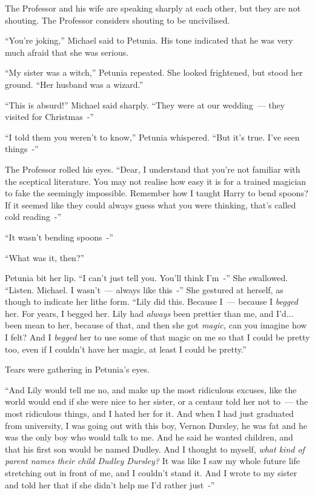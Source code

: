 The Professor and his wife are speaking sharply at each other, but they are not shouting. The Professor considers shouting to be uncivilised.

``You're joking,'' Michael said to Petunia. His tone indicated that he was very much afraid that she was serious.

``My sister was a witch,'' Petunia repeated. She looked frightened, but stood her ground. ``Her husband was a wizard.''

``This is absurd!'' Michael said sharply. ``They were at our wedding~--- they visited for Christmas~-''

``I told them you weren't to know,'' Petunia whispered. ``But it's true. I've seen things~-''

The Professor rolled his eyes. ``Dear, I understand that you're not familiar with the sceptical literature. You may not realise how easy it is for a trained magician to fake the seemingly impossible. Remember how I taught Harry to bend spoons? If it seemed like they could always guess what you were thinking, that's called cold reading~-''

``It wasn't bending spoons~-''

``What was it, then?''

Petunia bit her lip. ``I can't just tell you. You'll think I'm~-'' She swallowed. ``Listen. Michael. I wasn't~--- always like this~-'' She gestured at herself, as though to indicate her lithe form. ``Lily did this. Because I~--- because I \emph{begged} her. For years, I begged her. Lily had \emph{always} been prettier than me, and I'd... been mean to her, because of that, and then she got \emph{magic,} can you imagine how I felt? And I \emph{begged} her to use some of that magic on me so that I could be pretty too, even if I couldn't have her magic, at least I could be pretty.''

Tears were gathering in Petunia's eyes.

``And Lily would tell me no, and make up the most ridiculous excuses, like the world would end if she were nice to her sister, or a centaur told her not to~--- the most ridiculous things, and I hated her for it. And when I had just graduated from university, I was going out with this boy, Vernon Dursley, he was fat and he was the only boy who would talk to me. And he said he wanted children, and that his first son would be named Dudley. And I thought to myself, \emph{what kind of parent names their child Dudley Dursley?} It was like I saw my whole future life stretching out in front of me, and I couldn't stand it. And I wrote to my sister and told her that if she didn't help me I'd rather just~-''

